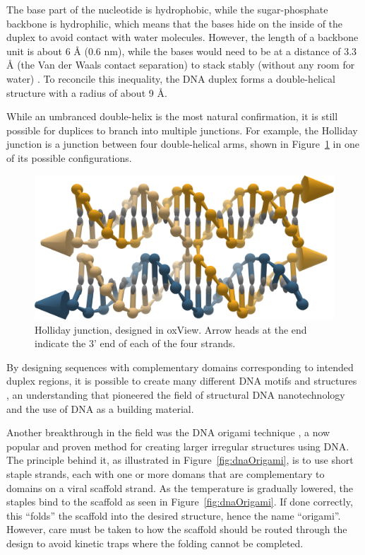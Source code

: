 The base part of the nucleotide is hydrophobic, while the sugar-phosphate backbone is hydrophilic, which means that the bases hide on the inside of the duplex to avoid contact with water molecules. However, the length of a backbone unit is about 6 Å (0.6 nm), while the bases would need to be at a distance of 3.3 Å (the Van der Waals contact separation) to stack stably (without any room for water) \cite{calladine1997understanding}. To reconcile this inequality, the DNA duplex forms a double-helical structure with a radius of about 9 Å.

While an umbranced double-helix is the most natural confirmation, it is still possible for duplices to branch into multiple junctions. For example, the Holliday junction is a junction between four double-helical arms, shown in Figure~\ref{fig:holliday} in one of its possible configurations.

\begin{figure}
    \centering\includegraphics[width=\textwidth]{figures/holliday.png}
    \caption{Holliday junction, designed in oxView. Arrow heads at the end indicate the 3' end of each of the four strands.}
    \label{fig:holliday}
\end{figure}



By designing sequences with complementary domains corresponding to intended duplex regions, it is possible to create many different DNA motifs and structures \cite{seeman_2016, Seeman1982}, an understanding that pioneered the field of structural DNA nanotechnology and the use of DNA as a building material.


Another breakthrough in the field was the DNA origami technique \cite{rothemund2006folding}, a now popular and proven method for creating larger irregular structures using DNA. The principle behind it, as illustrated in Figure~\ref{fig:dnaOrigami}, is to use short staple strands, each with one or more domans that are complementary to domains on a viral scaffold strand. As the temperature is gradually lowered, the staples bind to the scaffold as seen in Figure~\ref{fig:dnaOrigami}. If done correctly, this ``folds'' the scaffold into the desired structure, hence the name ``origami''. However, care must be taken to how the scaffold should be routed through the design to avoid kinetic traps where the folding cannot be completed.

